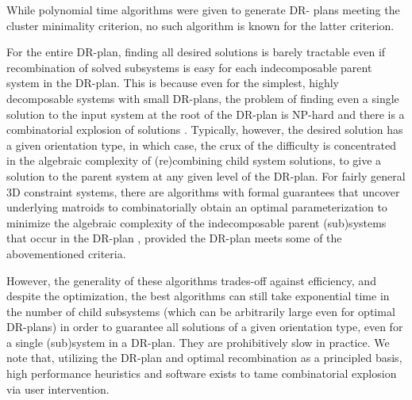 While polynomial time algorithms were given \cite{hoffman2001decompositionI} to generate DR-
plans meeting the cluster minimality criterion, no such algorithm is
known for the latter criterion.


\medskip\noindent
{}
For the entire DR-plan, finding all desired solutions is barely
tractable even if recombination of solved subsystems is easy for each
indecomposable parent system in the DR-plan. This is because even for
the simplest, highly decomposable systems with small DR-plans, the
problem of finding even a single solution to the input system at the
root of the DR-plan is NP-hard  \cite{saxe1979embeddability} 
and there is a combinatorial explosion of solutions \cite{borcea2004number}. Typically, however, the desired
solution has a given orientation type, in which case, the crux of the
difficulty is concentrated in the algebraic complexity of
(re)combining child system solutions, to give a solution to the parent
system at any given level of the DR-plan. For fairly general 3D
constraint systems, there are algorithms with formal guarantees that
uncover underlying matroids to combinatorially obtain an optimal
parameterization to minimize the algebraic complexity of the
indecomposable parent (sub)systems that occur in the DR-plan
\cite{sitharam2010optimized,sitharam2006well,sitharam2010reconciling}, provided the DR-plan meets some of the
abovementioned criteria.

However, the generality of these algorithms trades-off against
efficiency, and despite the optimization, the best algorithms can
still take exponential time in the number of child subsystems (which
can be arbitrarily large even for optimal DR-plans) in order to
guarantee all solutions of a given orientation type, even for a single
(sub)system in a DR-plan. They are prohibitively slow in practice. We
note that, utilizing the DR-plan and optimal recombination as a
principled basis, high performance heuristics and software exists
\cite{sitharam2006solution} to tame combinatorial explosion via user intervention.


